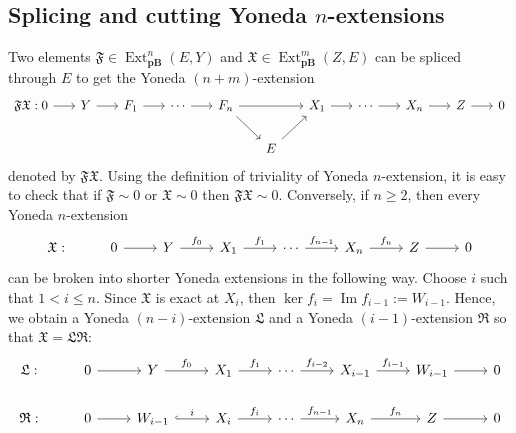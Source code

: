 \documentclass[12pt,a4paper]{amsproc}
\theoremstyle{remark}
\theoremstyle{definition}
\renewcommand\Im{\operatorname{Im}}
\newcommand{\Ext}{\operatorname{Ext}}
\newcommand{\pBan}{\operatorname{\textbf{pB}}}
\numberwithin{equation}{section}
\begin{document}
	\subsection*{Splicing and cutting Yoneda $n$-extensions}
	Two elements $\mathfrak{F} \in \Ext^n_{\boldsymbol{\pBan}}(E,Y)$ and $\mathfrak{X} \in \Ext^m_{\boldsymbol{\pBan}}(Z,E)$ can be spliced through $E$ to get the Yoneda $(n+m)$-extension
	\begin{equation}\notag
		\begin{tikzcd}[column sep=0.6 cm]
			\mathfrak{FX}: 0 \arrow[r] & Y \arrow[r] & F_1 \arrow[r] & \cdots \arrow[r] & F_n \arrow[rd] \arrow[rr] &              & X_1 \arrow[r] & \cdots \arrow[r] & X_n \arrow[r] & Z \arrow[r] & 0 \\
			&             &               &                  &                           & E \arrow[ru] &               &                  &               &             &  
		\end{tikzcd}
	\end{equation}
	denoted by $\mathfrak{F} \mathfrak{X}$. Using the definition of triviality of Yoneda $n$-extension, it is easy to check that if $\mathfrak{F} \sim 0$ or $\mathfrak{X} \sim 0$ then $\mathfrak{F} \mathfrak{X} \sim 0$. Conversely, if $n \geq 2$, then every Yoneda $n$-extension
	\begin{equation}
	\notag
	\begin{tikzcd}
		\mathfrak{X}: & 0 \arrow[r] & Y \arrow[r, "f_0"] & X_1 \arrow[r, "f_1"] & \cdots \arrow[r, "f_{n-1}"] & X_n \arrow[r, "f_n"] & Z \arrow[r] & 0
	\end{tikzcd}
\end{equation}
	can be broken into shorter Yoneda extensions in the following way. Choose $i$ such that $1 < i \leq n$. Since $\mathfrak{X}$ is exact at $X_i$, then $\ker f_i=\Im f_{i-1}:=W_{i-1}$. Hence, we obtain a Yoneda $(n-i)$-extension $\mathfrak{L}$ and a Yoneda $(i-1)$-extension $\mathfrak{R}$ so that $\mathfrak{X}=\mathfrak{L} \mathfrak{R}$:
	\begin{equation}\notag
	\begin{tikzcd}
		\mathfrak{L}: & 0 \arrow[r] & Y \arrow[r, "f_0"] & X_1 \arrow[r, "f_1"] & \cdots \arrow[r, "f_{i-2}"] & X_{i-1} \arrow[r, "f_{i-1}"] & W_{i-1} \arrow[r] & 0 \\
		\mathfrak{R}: & 0 \arrow[r] & W_{i-1} \arrow[r, "i", hook] & X_i \arrow[r, "f_i"] & \cdots \arrow[r, "f_{n-1}"] & X_n \arrow[r, "f_n"] & Z \arrow[r] & 0
	\end{tikzcd}
\end{equation}
\end{document}
